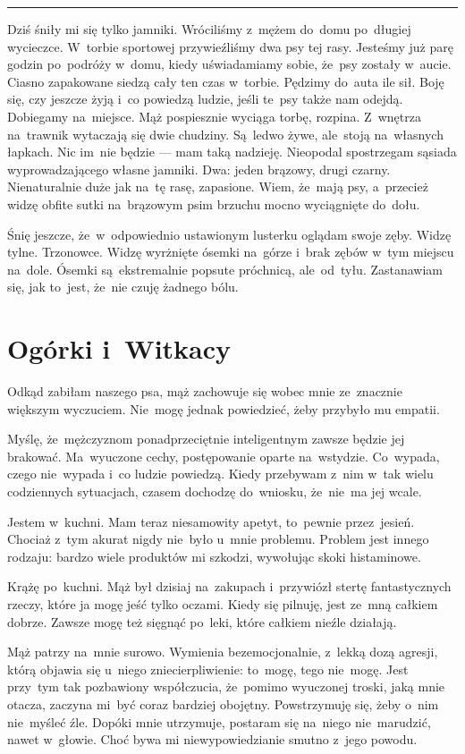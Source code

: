 \documentclass[9pt, a5paper]{memoir}
\begin{document}
\fancybreak{* \quad * \quad *}

Dziś śniły mi się tylko jamniki. Wróciliśmy z~mężem do~domu po~długiej wycieczce. W~torbie sportowej przywieźliśmy dwa psy tej rasy. Jesteśmy już parę godzin po~podróży w~domu, kiedy uświadamiamy sobie, że~psy zostały w~aucie. Ciasno zapakowane siedzą cały ten czas w~torbie. Pędzimy do~auta ile sił. Boję się, czy jeszcze żyją i~co powiedzą ludzie, jeśli te~psy także nam odejdą. Dobiegamy na~miejsce. Mąż pospiesznie wyciąga torbę, rozpina. Z~wnętrza na~trawnik wytaczają się dwie chudziny. Są~ledwo żywe, ale~stoją na~własnych łapkach. Nic im~nie będzie --- mam taką nadzieję. Nieopodal spostrzegam sąsiada wyprowadzającego własne jamniki. Dwa: jeden brązowy, drugi czarny. Nienaturalnie duże jak na~tę rasę, zapasione. Wiem, że~mają psy, a~przecież widzę obfite sutki na~brązowym psim brzuchu mocno wyciągnięte do~dołu.


Śnię jeszcze, że~w~odpowiednio ustawionym lusterku oglądam swoje zęby. Widzę tylne. Trzonowce. Widzę wyrżnięte ósemki na~górze i~brak zębów w~tym miejscu na~dole. Ósemki są~ekstremalnie popsute próchnicą, ale~od~tyłu. Zastanawiam się, jak to~jest, że~nie czuję żadnego bólu.

\newpage
\section{Ogórki i~Witkacy}
Odkąd zabiłam naszego psa, mąż zachowuje się wobec mnie ze~znacznie większym wyczuciem. Nie~mogę jednak powiedzieć, żeby przybyło mu empatii.

Myślę, że~mężczyznom ponadprzeciętnie inteligentnym zawsze będzie jej brakować. Ma~wyuczone cechy, postępowanie oparte na~wstydzie. Co~wypada, czego nie~wypada i~co ludzie powiedzą. Kiedy przebywam z~nim w~tak wielu codziennych sytuacjach, czasem dochodzę do~wniosku, że~nie~ma jej wcale.

Jestem w~kuchni. Mam teraz niesamowity apetyt, to~pewnie przez~jesień. Chociaż z~tym akurat nigdy nie~było u~mnie problemu. Problem jest innego rodzaju: bardzo wiele produktów mi szkodzi, wywołując skoki histaminowe.

Krążę po~kuchni. Mąż był dzisiaj na~zakupach i~przywiózł stertę fantastycznych rzeczy, które ja mogę jeść tylko oczami. Kiedy się pilnuję, jest ze~mną całkiem dobrze. Zawsze mogę też sięgnąć po~leki, które całkiem nieźle działają.

Mąż patrzy na~mnie surowo. Wymienia bezemocjonalnie, z~lekką dozą agresji, którą objawia się u~niego zniecierpliwienie: to~mogę, tego nie~mogę. Jest przy~tym tak pozbawiony współczucia, że~pomimo wyuczonej troski, jaką mnie otacza, zaczyna mi~być coraz bardziej obojętny. Powstrzymuję się, żeby o~nim nie~myśleć źle. Dopóki mnie utrzymuje, postaram się na~niego nie~marudzić, nawet w~głowie. Choć bywa mi niewypowiedzianie smutno z~jego powodu.
\end{document}
